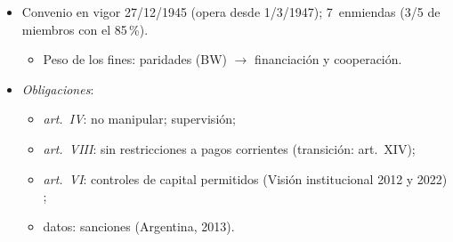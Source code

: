 \documentclass{article}
\begin{document}
\begin{columnas}
\begin{itemize}
\item Convenio en vigor 27/12/1945 (opera desde 1/3/1947); 7~enmiendas (3/5 de miembros con el 85\,\%).
  \begin{itemize}
  \item Peso de los fines: paridades (BW) $\to$ financiación y cooperación.
  \end{itemize}
\item \emph{Obligaciones}:
  \begin{itemize}
  \item \emph{art.~IV}: no manipular; supervisión;
  \item \emph{art.~VIII}: sin restricciones a pagos corrientes (transición: art.~XIV);
  \item \emph{art.~VI}: controles de capital permitidos (Visión institucional 2012 y 2022) ;
  \item datos: sanciones (Argentina, 2013).
  \end{itemize}
\end{itemize}


\end{columnas}
\end{document}
